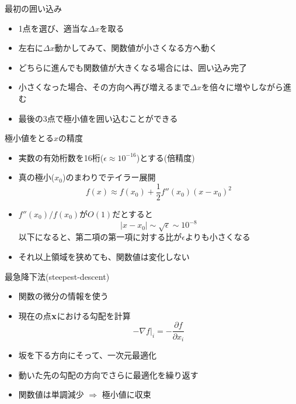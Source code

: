 \documentclass[dvipdfmx]{beamer}
\begin{document}
\begin{frame}[t,fragile]{最初の囲い込み}
  \begin{itemize}
    \setlength{\itemsep}{1em}
  \item 1点を選び、適当な$\Delta x$を取る
  \item 左右に$\Delta x$動かしてみて、関数値が小さくなる方へ動く
  \item どちらに進んでも関数値が大きくなる場合には、囲い込み完了
  \item 小さくなった場合、その方向へ再び増えるまで$\Delta x$を倍々に増やしながら進む
  \item 最後の3点で極小値を囲い込むことができる
  \end{itemize}
\end{frame}

\begin{frame}[t,fragile]{極小値をとる$x$の精度}
  \begin{itemize}
    \setlength{\itemsep}{1em}
  \item 実数の有効桁数を16桁($\epsilon \approx 10^{-16}$)とする(倍精度)
  \item 真の極小($x_0$)のまわりでテイラー展開
    \[
    f(x) \approx f(x_0) + \frac{1}{2} f''(x_0) (x-x_0)^2
    \]
  \item $f''(x_0) / f(x_0)$が$O(1)$だとすると
    \[
    |x-x_0| \sim \sqrt{\epsilon} \sim 10^{-8}
    \]
    以下になると、第二項の第一項に対する比が$\epsilon$よりも小さくなる
  \item それ以上領域を狭めても、関数値は変化しない
  \end{itemize}
\end{frame}

\begin{frame}[t,fragile]{最急降下法(steepest-descent)}
  \begin{itemize}
  \item 関数の微分の情報を使う
  \item 現在の点$\bf x$における勾配を計算
    \[
    -\nabla f|_i = -\frac{\partial f}{\partial x_i}
    \]
  \item 坂を下る方向にそって、一次元最適化
  \item 動いた先の勾配の方向でさらに最適化を繰り返す
  \item 関数値は単調減少 $\Rightarrow$ 極小値に収束
  \end{itemize}
\end{frame}
\end{document}
